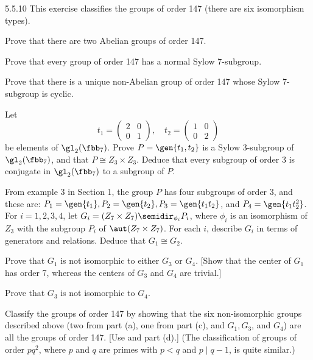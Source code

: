 \begin{spex}{5.5.10}
    This exercise classifies the groups of order 147 (there are six isomorphism types).
    \begin{subexercises}
        \item Prove that there are two Abelian groups of order 147.
        \item Prove that every group of order 147 has a normal Sylow 7-subgroup.
        \item Prove that there is a unique non-Abelian group of order 147 whose Sylow 7-subgroup is cyclic.
        \item Let
        \[
        	t_1 = 
            \begin{pmatrix}
                2 & 0 \\
                0 & 1
            \end{pmatrix}, \quad
            t_2 = 
            \begin{pmatrix}
                1 & 0 \\
                0 & 2
            \end{pmatrix}
        \]
        be elements of $\gl_2(\fbb_7)$.
	    Prove $P = \gen{t_1, t_2}$ is a Sylow 3-subgroup of $\gl_2(\fbb_7)$, and that $P \cong Z_3 \times Z_3$.
	    Deduce that every subgroup of order 3 is conjugate in $\gl_2(\fbb_7)$ to a subgroup of $P$.
        \item From example 3 in Section 1, the group $P$ has four subgroups of order 3, and these are: $P_1 = \gen{t_1}, P_2 = \gen{t_2}, P_3 = \gen{t_1t_2}$, and $P_4 = \gen{t_1t_2^2}$.
	    For $i = 1, 2, 3, 4$, let $G_i = (Z_7 \times Z_7) \semidir_{\phi_i} P_i$, where $\phi_i$ is an isomorphism of $Z_3$ with the subgroup $P_i$ of $\aut(Z_7 \times Z_7)$.
	    For each $i$, describe $G_i$ in terms of generators and relations.
	    Deduce that $G_1 \cong G_2$.
        \item Prove that $G_1$ is not isomorphic to either $G_3$ or $G_4$. [Show that the center of $G_1$ has order 7, whereas the centers of $G_3$ and $G_4$ are trivial.]
        \item Prove that $G_3$ is not isomorphic to $G_4$.
        \item Classify the groups of order 147 by showing that the six non-isomorphic groups described above (two from part (a), one from part (c), and $G_1, G_3$, and $G_4$) are all the groups of order 147. [Use  and part (d).] (The classification of groups of order $pq^2$, where $p$ and $q$ are primes with $p < q$ and $p \mid q - 1$, is quite similar.)
    \end{subexercises}
\end{spex}

